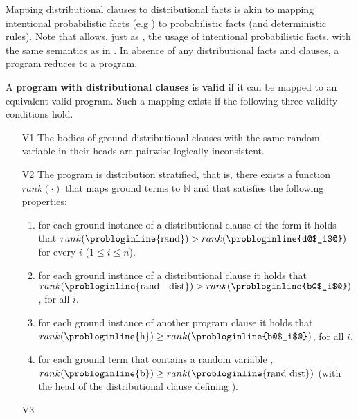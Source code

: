 Mapping distributional clauses to distributional facts is akin to mapping intentional probabilistic facts (e.g ) to probabilistic facts (and deterministic rules). Note that \dcproblogsty allows, just as \problogsty, the usage of intentional probabilistic facts, with the same semantics as in \problogsty. In absence of any distributional facts and clauses, a \dcproblogsty program reduces to a \problogsty program.


\begin{theorem}\label{theo:valid_dcproblog_w_clauses} A {\bf \dcproblogsty program} \dcpprogram{} {\bf with distributional clauses} is {\bf valid} if it can be mapped to an equivalent valid \dcproblogsty program. Such a mapping exists if the following three validity conditions hold.
	\begin{itemize}
		\item[V1] The bodies of ground distributional clauses with the same random variable in their heads are pairwise logically inconsistent.
		\item[V2] The program \dcpprogram is distribution stratified, that is, there exists a function $rank(\cdot)$ that maps ground terms to $\mathbb{N}$ and that satisfies the following properties:
		\begin{enumerate}			
			\item for each ground instance of a distributional clause of the form \linebreak {} it holds that   $rank(\text{\probloginline{rand}})>rank(\text{\probloginline{d@$_i$@}})$ for every $i$ ($1\leq i \leq n$).
			\item for each ground instance of a distributional clause  it holds that $rank(\text{\probloginline{rand ~ dist}})>rank(\text{\probloginline{b@$_i$@}})$, for all $i$.
			\item for each ground instance of another program clause  it holds that $rank(\text{\probloginline{h}})\geq rank(\text{\probloginline{b@$_i$@}})$, for all $i$.
			\item for each ground term  that contains a random variable , $rank(\text{\probloginline{b}})\geq rank(\text{\probloginline{rand~dist}})$ (with  the head of the distributional clause defining ).
		\end{enumerate}
	    \item[V3] 
	\end{itemize}

\end{theorem}

